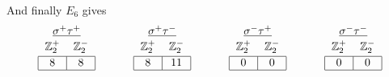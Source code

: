 \documentclass[11pt]{article}
\begin{document}
And finally $E_6$ gives
\begin{equation}
\begin{tabular}{| c | c |}
\multicolumn{2}{c}{$\underline{\sigma^+ \tau^+}$} \\[-1em]
\multicolumn{1}{c}{} & \multicolumn{1}{c}{} \\
\multicolumn{1}{c}{$\mathbb{Z}_2^+$} & \multicolumn{1}{c}{$\mathbb{Z}_2^-$} \\[-1em]
\multicolumn{1}{c}{} & \multicolumn{1}{c}{} \\
\hline
8 & 8 \\
\hline
\end{tabular} 
\hspace{1.2cm}
\begin{tabular}{| c | c |}
\multicolumn{2}{c}{$\underline{\sigma^+ \tau^-}$} \\[-1em]
\multicolumn{1}{c}{} & \multicolumn{1}{c}{} \\
\multicolumn{1}{c}{$\mathbb{Z}_2^+$} & \multicolumn{1}{c}{$\mathbb{Z}_2^-$} \\[-1em]
\multicolumn{1}{c}{} & \multicolumn{1}{c}{} \\
\hline
8 & 11 \\
\hline
\end{tabular} 
\hspace{1.2cm}
\begin{tabular}{| c | c |}
\multicolumn{2}{c}{$\underline{\sigma^- \tau^+}$} \\[-1em]
\multicolumn{1}{c}{} & \multicolumn{1}{c}{} \\
\multicolumn{1}{c}{$\mathbb{Z}_2^+$} & \multicolumn{1}{c}{$\mathbb{Z}_2^-$} \\[-1em]
\multicolumn{1}{c}{} & \multicolumn{1}{c}{} \\
\hline
0 & 0 \\
\hline
\end{tabular} 
\hspace{1.2cm}
\begin{tabular}{| c | c |}
\multicolumn{2}{c}{$\underline{\sigma^- \tau^-}$} \\[-1em]
\multicolumn{1}{c}{} & \multicolumn{1}{c}{} \\
\multicolumn{1}{c}{$\mathbb{Z}_2^+$} & \multicolumn{1}{c}{$\mathbb{Z}_2^-$} \\[-1em]
\multicolumn{1}{c}{} & \multicolumn{1}{c}{} \\
\hline
0 & 0 \\
\hline
\end{tabular} 
\end{equation}
\end{document}

